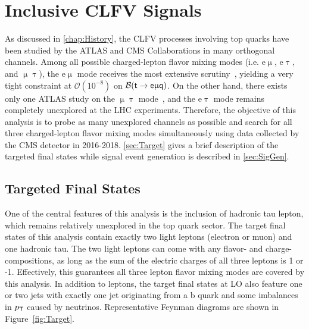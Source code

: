 \chapter{Inclusive CLFV Signals}
\label{chap:Signal}

As discussed in \autoref{chap:History}, the \ac{CLFV} processes involving top quarks have been studied by the \ac{ATLAS} and \ac{CMS} Collaborations in many orthogonal channels. Among all possible charged-lepton flavor mixing modes (i.e. e$\upmu$, e$\uptau$, and $\upmu\uptau$), the e$\upmu$ mode receives the most extensive scrutiny~\cite{ATLAS-CONF-2018-044,CMS:2022ztx,CMS:2023phe}, yielding a very tight constraint at $\mathcal{O}(10^{-8})$ on $\mathcal{B}(\textsf{t}\rightarrow\textsf{e}\upmu\textsf{q})$. On the other hand, there exists only one \ac{ATLAS} study on the $\upmu\uptau$ mode~\cite{ATLAS-CONF-2023-001}, and the e$\uptau$ mode remains completely unexplored at the \ac{LHC} experiments. Therefore, the objective of this analysis is to probe as many unexplored channels as possible and search for all three charged-lepton flavor mixing modes simultaneously using data collected by the \ac{CMS} detector in 2016-2018. \autoref{sec:Target} gives a brief description of the targeted final states while signal event generation is described in \autoref{sec:SigGen}.
\section{Targeted Final States}
\label{sec:Target}

One of the central features of this analysis is the inclusion of hadronic tau lepton, which remains relatively unexplored in the top quark sector. The target final states of this analysis contain exactly two light leptons (electron or muon) and one hadronic tau. The two light leptons can come with any flavor- and charge-compositions, as long as the sum of the electric charges of all three leptons is 1 or -1. Effectively, this guarantees all three lepton flavor mixing modes are covered by this analysis. In addition to leptons, the target final states at \ac{LO} also feature one or two jets with exactly one jet originating from a b quark and some imbalances in $p_{\textsf{T}}$ caused by neutrinos. Representative Feynman diagrams are shown in Figure~\ref{fig:Target}.

